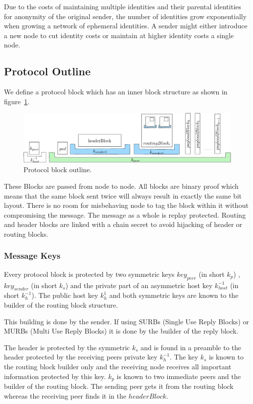 \documentclass[9pt,journal,compsoc]{IEEEtran}
\begin{document}
Due to the costs of maintaining multiple identities and their parental identities for anonymity of the original sender, the number of identities grow exponentially when growing a network of ephemeral identities. A sender might either introduce a new node to cut identity costs or maintain at higher identity costs a single node.

\subsection{Protocol Outline}
We define a protocol block which has an inner block structure as shown in figure~\ref{fig:blocks}.

\begin{figure}[!t]
	\centering
	\includegraphics[width=\columnwidth]{../inc/blockLayoutSimplified}
	\caption{Protocol block outline.}
	\label{fig:blocks}
\end{figure}

These Blocks are passed from node to node. All blocks are binary proof which means that the same block sent twice will always result in exactly the same bit layout. There is no room for misbehaving node to tag the block within it without compromising the message. The message as a whole is replay protected. Routing and header blocks are linked with a chain secret to avoid hijacking of header or routing blocks.

\subsubsection{Message Keys}
Every protocol block is protected by two symmetric keys $key_{peer}$ (in short $k_p$) , $key_{sender}$ (in short $k_s$) and the private part of an asymmetric host key $k^{-1}_{host}$ (in short $k^{-1}_h$). The public host key $k^{1}_h$ and both symmetric keys are known to the builder of the routing block structure. 

This building is done by the sender. If using SURBs (Single Use Reply Blocks) or MURBs (Multi Use Reply Blocks) it is done by the builder of the reply block. 

The header is protected by the symmetric $k_s$ and is found in a preamble to the header protected by the receiving peers private key $k^{-1}_h$. The key $k_s$ is known to the routing block builder only and the receiving node receives all important information protected by this key. $k_{p}$ is known to two immediate peers and the builder of the routing block. The sending peer gets it from the routing block whereas the receiving peer finds it in the $headerBlock$. 
\end{document}
